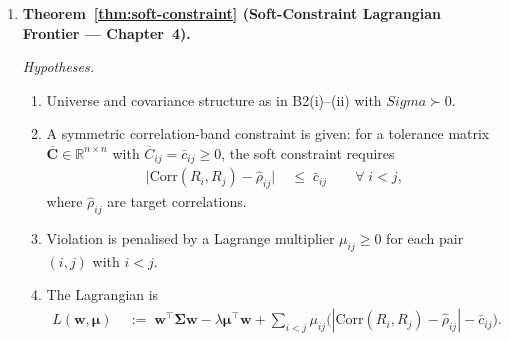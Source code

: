 \documentclass[12pt,openany]{book}
\newcommand{\bfSigma}{\boldsymbol{\Sigma}}
\numberwithin{equation}{chapter}
\theoremstyle{plain}
\theoremstyle{definition}
\theoremstyle{remark}
\def\mathcal#1{#1}%
\def\bfSigma{Sigma}%
\begin{document}
\begin{enumerate}[label=\textbf{B\arabic*.}, leftmargin=*, widest=B3,
                  itemsep=6pt, parsep=2pt]
        \emph{Dependencies.} A1; convex analysis
        (Rockafellar~\cite{rockafellar1970}); extreme-value theorem.

  \item \textbf{Theorem~\ref{thm:soft-constraint}
        (Soft-Constraint Lagrangian Frontier — Chapter~4).}

        \emph{Hypotheses.}
        \begin{enumerate}[label=(\roman*), itemsep=2pt]
          \item Universe and covariance structure as in B2(i)--(ii)
                with $\bfSigma \succ 0$.
          \item A symmetric correlation-band constraint is given:
                for a tolerance matrix
                $\overline{\mathbf{C}} \in \mathbb{R}^{n \times n}$ with
                $\overline{C}_{ij} = \bar{c}_{ij} \geq 0$,
                the soft constraint requires
                \begin{align}
                  \bigl|
                    \mathrm{Corr}(R_i, R_j) - \hat{\rho}_{ij}
                  \bigr|
                    &\;\leq\; \bar{c}_{ij}
                  \qquad \forall\; i < j,
                  \label{eq:sum-soft-band}
                \end{align}
                where $\hat{\rho}_{ij}$ are target correlations.
          \item Violation is penalised by a Lagrange multiplier
                $\mu_{ij} \geq 0$ for each pair $(i,j)$ with $i < j$.
          \item The Lagrangian is
                \begin{align}
                  \mathcal{L}(\mathbf{w}, \boldsymbol{\mu})
                    &\;:=\;
                      \mathbf{w}^\top\boldsymbol{\Sigma}\mathbf{w}
                      - \lambda\boldsymbol{\mu}^\top\mathbf{w}
                      + \sum_{i<j} \mu_{ij}
                        \bigl(
                          |\mathrm{Corr}(R_i,R_j) - \hat{\rho}_{ij}|
                          - \bar{c}_{ij}
                        \bigr).
                  \label{eq:sum-lagrangian}
                \end{align}
        \end{enumerate}


\end{enumerate}
\end{document}
